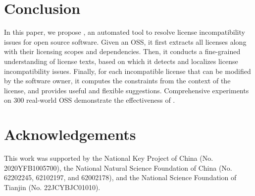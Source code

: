 \section{Conclusion}
In this paper, we propose \tool, an {automated} tool to resolve license incompatibility issues for open source software. Given an OSS, it first extracts all licenses along with their licensing scopes and dependencies. 
Then, it conducts a fine-grained understanding of license texts, based on which it detects and localizes license incompatibility issues. Finally, for each incompatible license that can be modified by the software owner, 
it computes the constraints from the context of the license, and provides useful and flexible suggestions. Comprehensive experiments on 300 real-world OSS demonstrate the effectiveness of \tool. %


\section*{Acknowledgements}
This work was supported by the National Key Project of China (No. 2020YFB1005700), the National Natural Science Foundation of China (No. 62202245, 62102197, and 62002178), and the National Science Foundation of Tianjin (No. 22JCYBJC01010).